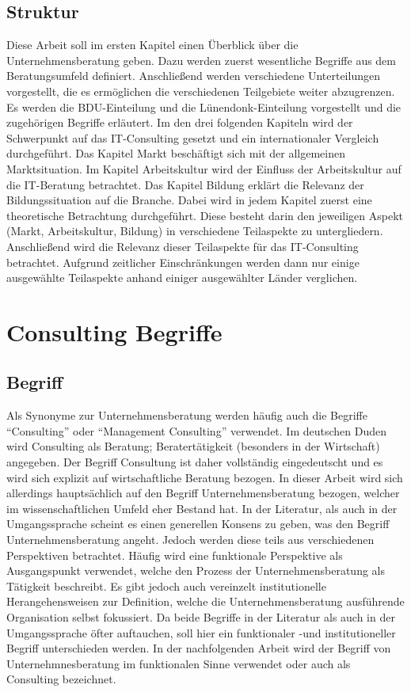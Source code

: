 \subsection*{Struktur}
Diese Arbeit soll im ersten Kapitel einen Überblick über die Unternehmensberatung geben. Dazu werden zuerst wesentliche Begriffe aus dem Beratungsumfeld definiert. Anschließend werden verschiedene Unterteilungen vorgestellt, die es ermöglichen die verschiedenen Teilgebiete weiter abzugrenzen. Es werden die BDU-Einteilung und die Lünendonk-Einteilung vorgestellt und die zugehörigen Begriffe erläutert.
Im den drei folgenden Kapiteln wird der Schwerpunkt auf das IT-Consulting gesetzt und ein internationaler Vergleich durchgeführt. Das Kapitel Markt beschäftigt sich mit der allgemeinen Marktsituation. Im Kapitel Arbeitskultur wird der Einfluss der Arbeitskultur auf die IT-Beratung betrachtet. Das Kapitel Bildung erklärt die Relevanz der Bildungssituation auf die Branche. Dabei wird in jedem Kapitel zuerst eine theoretische Betrachtung durchgeführt. Diese besteht darin den jeweiligen Aspekt (Markt, Arbeitskultur, Bildung) in verschiedene Teilaspekte zu untergliedern. Anschließend wird die Relevanz dieser Teilaspekte für das IT-Consulting betrachtet. Aufgrund zeitlicher Einschränkungen werden dann nur einige ausgewählte Teilaspekte anhand einiger ausgewählter Länder verglichen. 

\section{Consulting Begriffe}
\subsection*{Begriff}
Als Synonyme zur Unternehmensberatung werden häufig auch die Begriffe “Consulting”
oder “Management Consulting” verwendet. Im deutschen Duden wird Consulting als Beratung; Beratertätigkeit (besonders in der Wirtschaft) angegeben. Der Begriff Consultung ist daher vollständig eingedeutscht und es wird sich explizit auf wirtschaftliche Beratung bezogen. 
In dieser Arbeit wird sich allerdings hauptsächlich auf den Begriff Unternehmensberatung bezogen, welcher im wissenschaftlichen Umfeld eher Bestand hat.
In der Literatur, als auch in der Umgangssprache scheint es einen generellen Konsens zu geben, was den Begriff Unternehmensberatung angeht. 
Jedoch werden diese teils aus verschiedenen Perspektiven betrachtet. Häufig wird eine funktionale Perspektive als Ausgangspunkt verwendet, welche den Prozess der Unternehmensberatung als Tätigkeit beschreibt. Es gibt jedoch auch vereinzelt institutionelle Herangehensweisen zur Definition, welche die Unternehmensberatung ausführende Organisation selbst fokussiert. Da beide Begriffe in der Literatur als auch in der Umgangssprache öfter auftauchen, soll hier ein funktionaler -und institutioneller Begriff unterschieden werden. In der nachfolgenden Arbeit wird der Begriff von Unternehmnesberatung im funktionalen Sinne verwendet oder auch als Consulting bezeichnet.

